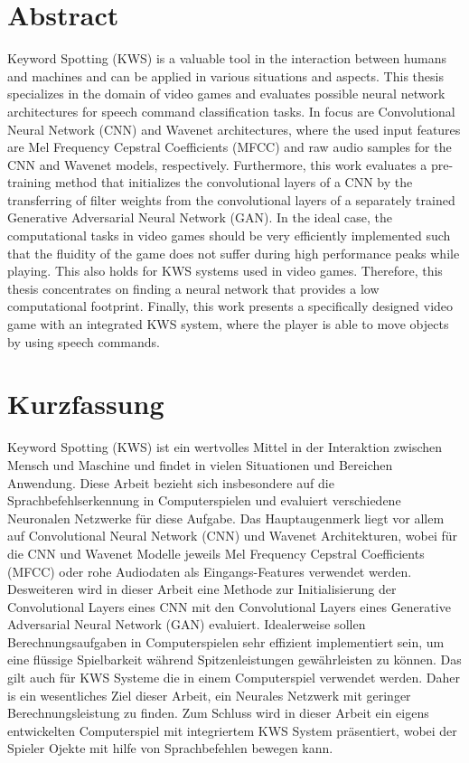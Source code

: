 
\chapter*{Abstract}\label{sec:shards_abstract}
Keyword Spotting (KWS) is a valuable tool in the interaction between humans and machines and can be applied in various situations and aspects.
This thesis specializes in the domain of video games and evaluates possible neural network architectures for speech command classification tasks.
In focus are Convolutional Neural Network (CNN) and Wavenet architectures, where the used input features are Mel Frequency Cepstral Coefficients (MFCC) and raw audio samples for the CNN and Wavenet models, respectively.
Furthermore, this work evaluates a pre-training method that initializes the convolutional layers of a CNN by the transferring of filter weights from the convolutional layers of a separately trained Generative Adversarial Neural Network (GAN).
In the ideal case, the computational tasks in video games should be very efficiently implemented such that the fluidity of the game does not suffer during high performance peaks while playing.
This also holds for KWS systems used in video games.
Therefore, this thesis concentrates on finding a neural network that provides a low computational footprint.
Finally, this work presents a specifically designed video game with an integrated KWS system, where the player is able to move objects by using speech commands.



\chapter*{Kurzfassung}
Keyword Spotting (KWS) ist ein wertvolles Mittel in der Interaktion zwischen Mensch und Maschine und findet in vielen Situationen und Bereichen Anwendung.
Diese Arbeit bezieht sich insbesondere auf die Sprachbefehlserkennung in Computerspielen und evaluiert verschiedene Neuronalen Netzwerke für diese Aufgabe.
Das Hauptaugenmerk liegt vor allem auf Convolutional Neural Network (CNN) und Wavenet Architekturen, wobei für die CNN und Wavenet Modelle jeweils Mel Frequency Cepstral Coefficients (MFCC) oder rohe Audiodaten als Eingangs-Features verwendet werden.
Desweiteren wird in dieser Arbeit eine Methode zur Initialisierung der Convolutional Layers eines CNN mit den Convolutional Layers eines Generative Adversarial Neural Network (GAN) evaluiert.
Idealerweise sollen Berechnungsaufgaben in Computerspielen sehr effizient implementiert sein, um eine flüssige Spielbarkeit während Spitzenleistungen gewährleisten zu können.
Das gilt auch für KWS Systeme die in einem Computerspiel verwendet werden.
Daher is ein wesentliches Ziel dieser Arbeit, ein Neurales Netzwerk mit geringer Berechnungsleistung zu finden.
Zum Schluss wird in dieser Arbeit ein eigens entwickelten Computerspiel mit integriertem KWS System präsentiert, wobei der Spieler Ojekte mit hilfe von Sprachbefehlen bewegen kann.